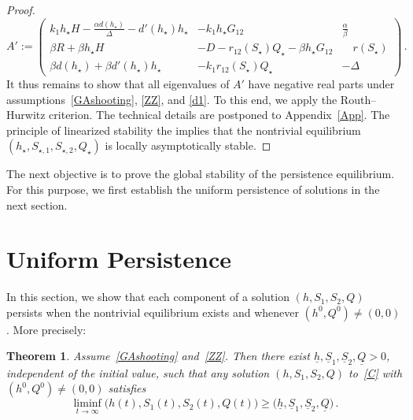 \documentclass[reqno,11pt]{amsart}
\newtheorem{thm}{Theorem}[section]
\numberwithin{equation}{section}
\begin{document}
\begin{proof}
\begin{equation}\label{MA}
A':=\left(\begin{matrix}
  k_1 h_\star   H -\frac{\alpha  d(h_\star)}{\Delta}-d'(h_\star)  h_\star   & - k_1  h_\star   G_{12} & \frac{\alpha}{\beta}\\[4pt]
\beta R+\beta h_\star H   & -D-r_{12}(S_\star) Q_\star-\beta h_\star  G_{12} &\quad r(S_\star)\\[4pt]
\beta d(h_\star)+\beta d'(h_\star)h_\star   &  -k_1 r_{12}(S_\star) Q_\star & -\Delta
\end{matrix}\right)\,.
\end{equation}
It thus remains to show that all eigenvalues of $A'$ have negative real parts under assumptions~\eqref{GAshooting}, \eqref{ZZ}, and \eqref{d1}. To this end, we apply the Routh–Hurwitz criterion. The technical details are postponed to Appendix~\ref{App}. The principle of linearized stability the implies that the nontrivial equilibrium $(h_\star,S_{\star,1},S_{\star,2},Q_\star)$ is locally asymptotically stable.
\end{proof}

The next objective is to prove the global stability of the persistence equilibrium. For this purpose, we first establish the uniform persistence of solutions in the next section.


\section{Uniform Persistence}\label{sec:6}

In this section, we show that each component of a solution $(h,S_1,S_2,Q)$ persists when the nontrivial equilibrium exists and whenever $(h^0,Q^0)\not=(0,0)$. More precisely:

\begin{thm}\label{persistence}
Assume~\eqref{GAshooting} and~\eqref{ZZ}. Then there exist $\underline{h}, \underline{S}_1, \underline{S}_2,\underline{Q}>0$, independent of the initial value, such that any solution $(h,S_1,S_2,Q)$ to~\eqref{C} with $(h^0,Q^0)\not=(0,0)$ satisfies
\begin{equation}\label{persistX}
\liminf_{t\to\infty} \big(h(t),S_1(t),S_2(t),Q(t)\big)\ge \big(\underline{h},\underline{S}_1,\underline{S}_2,\underline{Q}\big)\,.%
\end{equation}
\end{thm}
\end{document}
